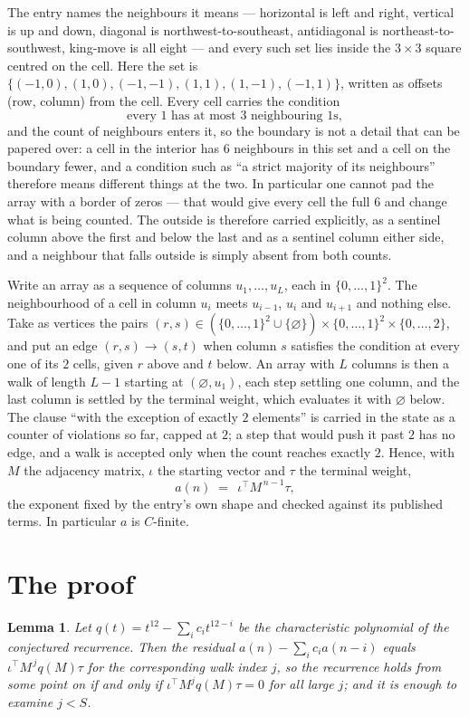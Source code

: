 \documentclass[11pt,a4paper]{article}
\theoremstyle{plain}
\newtheorem{lemma}[theorem]{Lemma}
\theoremstyle{definition}
\begin{document}
The entry names the neighbours it means --- horizontal is left and right, vertical is up and
down, diagonal is northwest-to-southeast, antidiagonal is northeast-to-southwest, king-move is
all eight --- and every such set lies inside the $3\times3$ square centred on the cell. Here
the set is $\{(-1,0), (1,0), (-1,-1), (1,1), (1,-1), (-1,1)\}$, written as offsets (row, column) from the cell. Every cell carries
the condition
\[
\text{every 1 has at most 3 neighbouring 1s},
\]
and the count of neighbours enters it, so the boundary is not a detail that can be papered
over: a cell in the interior has $6$ neighbours in this set and a cell on the boundary
fewer, and a condition such as ``a strict majority of its neighbours'' therefore means
different things at the two. In particular one cannot pad the array with a border of zeros ---
that would give every cell the full $6$ and change what is being counted. The outside is
therefore carried
explicitly, as a sentinel column above the first and below the last and as a sentinel column
either side, and a neighbour that falls outside is simply absent from both counts.

Write an array as a sequence of columns $u_1,\dots,u_L$, each in
$\{0,\dots,1\}^{2}$. The neighbourhood of a cell in column $u_i$ meets $u_{i-1}$,
$u_i$ and $u_{i+1}$ and nothing else. Take as vertices the pairs
$(r,s)\in(\{0,\dots,1\}^{2}\cup\{\varnothing\})\times\{0,\dots,1\}^{2} \times \{0,\dots,2\}$,
and put an edge $(r,s)\to(s,t)$ when column $s$ satisfies the condition at every one of its
$2$ cells, given $r$ above and $t$ below. An array with $L$ columns is then a walk of length
$L-1$ starting at $(\varnothing,u_1)$, each step settling one column, and the last column is
settled by the terminal weight, which evaluates it with $\varnothing$ below. The clause ``with the exception of exactly $2$ elements'' is carried in
the state as a counter of violations so far, capped at $2$; a step that would push it past
$2$ has no edge, and a walk is accepted only when the count reaches exactly $2$. Hence,
with $M$ the adjacency matrix, $\iota$ the starting vector and $\tau$ the terminal weight,
\[
a(n)\;=\;\,\iota^{\!\top}M^{\,n-1}\tau ,
\]
the exponent fixed by the entry's own shape and checked against its published terms. In
particular $a$ is $C$-finite.

\section{The proof}

\begin{lemma}\label{lem:crit}
Let $q(t)=t^{12}-\sum_i c_it^{12-i}$ be the characteristic polynomial of the
conjectured recurrence. Then the residual $a(n)-\sum_ic_ia(n-i)$ equals
$\iota^{\!\top}M^{\,j}q(M)\tau$ for the corresponding walk index $j$, so the
recurrence holds from some point on if and only if $\iota^{\!\top}M^{j}q(M)\tau=0$ for all
large $j$; and it is enough to examine $j<S$.
\end{lemma}
\end{document}

